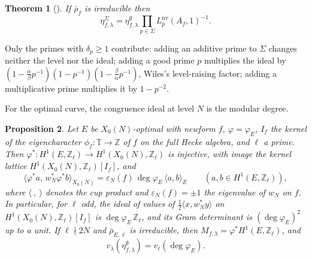 \documentclass[11pt]{amsart}
\newtheorem{theorem}{Theorem}[section]
\newtheorem{proposition}[theorem]{Proposition}
\theoremstyle{definition}
\newcommand{\Z}{\mathbb{Z}}
\newcommand{\T}{\mathbb{T}}
\newcommand{\degphi}{\deg\varphi_E}
\newcommand{\nv}{\mathrm{nv}}
\begin{document}
\begin{theorem}[{\cite[Proposition 1.4(c)]{DFG04}}]\label{thm:dfg14}
If $\bar\rho_f$ is irreducible then
\[
\eta^\Sigma_{f,\lambda}=\eta^{\emptyset}_{f,\lambda}\prod_{p\in\Sigma}L_p^{\nv}(A_f,1)^{-1}.
\]
\end{theorem}
Only the primes with $\delta_p\ge1$ contribute: adding an additive prime to $\Sigma$ changes neither the level nor the ideal; adding a good prime $p$ multiplies the ideal by $(1-\frac\alpha\beta p^{-1})(1-p^{-1})(1-\frac\beta\alpha p^{-1})$, Wiles's level-raising factor; adding a multiplicative prime multiplies it by $1-p^{-2}$.

For the optimal curve, the congruence ideal at level $N$ is the modular degree.

\begin{proposition}\label{prop:pullback}
Let $E$ be $X_0(N)$-optimal with newform $f$, $\varphi=\varphi_E$, $I_f$ the kernel of the eigencharacter $\phi_f\colon\T\to\Z$ of $f$ on the full Hecke algebra, and $\ell$ a prime. Then $\varphi^*\colon H^1(E,\Z_\ell)\to H^1(X_0(N),\Z_\ell)$ is injective, with image the kernel lattice $H^1(X_0(N),\Z_\ell)[I_f]$, and
\[
\langle\varphi^*a,\,w_N^*\varphi^*b\rangle_{X_0(N)}=\varepsilon_N(f)\,\degphi\,\langle a,b\rangle_E\qquad(a,b\in H^1(E,\Z_\ell)),
\]
where $\langle\ ,\ \rangle$ denotes the cup product and $\varepsilon_N(f)=\pm1$ the eigenvalue of $w_N$ on $f$. In particular, for $\ell$ odd, the ideal of values of $\frac12\langle x,w_N^*y\rangle$ on $H^1(X_0(N),\Z_\ell)[I_f]$ is $\degphi\,\Z_\ell$, and its Gram determinant is $(\degphi)^2$ up to a unit. If $\ell\nmid2N$ and $\bar\rho_{E,\ell}$ is irreducible, then $M_{f,\lambda}=\varphi^*H^1(E,\Z_\ell)$, and
\[
v_\lambda(\eta^\emptyset_{f,\lambda})=v_\ell(\degphi).
\]
\end{proposition}
\end{document}

